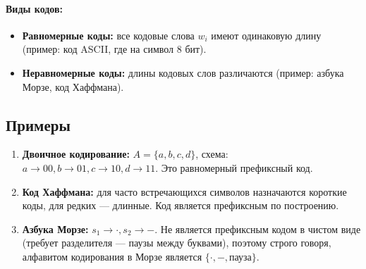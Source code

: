 \paragraph{Виды кодов:}
\begin{itemize}
    \item \textbf{Равномерные коды:} все кодовые слова $w_i$ имеют одинаковую длину (пример: код ASCII, где на символ 8 бит).
    \item \textbf{Неравномерные коды:} длины кодовых слов различаются (пример: азбука Морзе, код Хаффмана).
\end{itemize}

\subsection*{Примеры}
\begin{enumerate}
    \item \textbf{Двоичное кодирование:} $A = \{a, b, c, d\}$, схема: $a \to 00, b \to 01, c \to 10, d \to 11$. Это равномерный префиксный код.
    \item \textbf{Код Хаффмана:} для часто встречающихся символов назначаются короткие коды, для редких — длинные. Код является префиксным по построению.
    \item \textbf{Азбука Морзе:} $s_1 \to \cdot, s_2 \to -$. Не является префиксным кодом в чистом виде (требует разделителя — паузы между буквами), поэтому строго говоря, алфавитом кодирования в Морзе является $\{\cdot, -, \text{пауза}\}$.
\end{enumerate}
